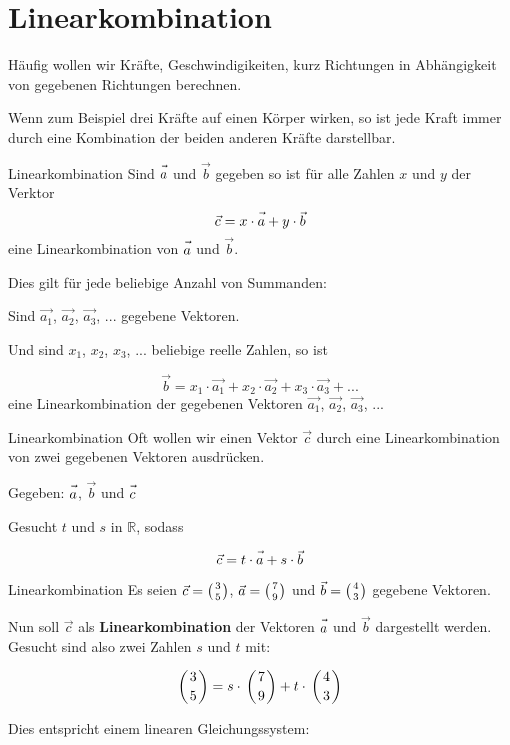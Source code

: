 \section{Linearkombination}


Häufig wollen wir Kräfte, Geschwindigikeiten, kurz Richtungen in
Abhängigkeit von gegebenen Richtungen berechnen.

Wenn zum Beispiel drei Kräfte auf einen Körper wirken, so ist jede
Kraft immer durch eine Kombination der beiden anderen Kräfte
darstellbar.

\begin{definition}{Linearkombination}{}
  Sind $\vec{a\vphantom{b}}$ und $\vec{b}$ gegeben so ist für alle Zahlen $x$ und
  $y$ der Verktor
  $$\vec{c} = x\cdot{}\vec{a\vphantom{b}} + y\cdot{}\vec{b}$$
  eine Linearkombination von $\vec{a\vphantom{b}}$ und $\vec{b}$.

  Dies gilt für jede beliebige Anzahl von Summanden:

  Sind $\vec{a_1}$, $\vec{a_2}$, $\vec{a_3}$, ... gegebene Vektoren.

  Und sind $x_1$, $x_2$, $x_3$, ... beliebige reelle Zahlen, so ist

  $$\vec{b} = x_1\cdot{}\vec{a_1} +  x_2\cdot{}\vec{a_2} +
  x_3\cdot{}\vec{a_3} + ...$$
  eine Linearkombination der gegebenen Vektoren $\vec{a_1}$, $\vec{a_2}$, $\vec{a_3}$, ... 
  \end{definition}


\begin{gesetz}{Linearkombination}{}
Oft wollen wir einen Vektor $\vec{c}$ durch eine Linearkombination von
zwei gegebenen Vektoren ausdrücken.

Gegeben: $\vec{a\vphantom{b}}$, $\vec{b}$ und $\vec{c\vphantom{b}}$

Gesucht $t$ und $s$ in $\mathbb{R}$, sodass

$$\vec{c} = t\cdot{}\vec{a\vphantom{b}} + s\cdot{}\vec{b}$$

\end{gesetz}
\newpage

\begin{beispiel}{Linearkombination}{}
  Es seien $\vec{c} = \left(3 \atop 5\right)$, $\vec{a} = \left(7 \atop
  9\right)$ und $\vec{b} = \left(4 \atop 3\right)$ gegebene Vektoren.

  Nun soll $\vec{c}$ als \textbf{Linearkombination} der Vektoren
  $\vec{a\vphantom{b}}$ und $\vec{b}$ dargestellt werden. Gesucht sind also zwei
  Zahlen $s$ und $t$ mit:

  $$\left(3 \atop 5\right) = s\cdot{} \left(7 \atop 9\right) +
  t\cdot{} \left(4 \atop 3\right)$$

  Dies entspricht einem linearen Gleichungssystem:
\end{beispiel}

